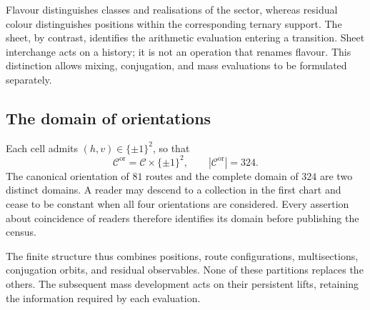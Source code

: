 Flavour distinguishes classes and realisations of the sector, whereas residual
colour distinguishes positions within the corresponding ternary support.
The sheet, by contrast, identifies the arithmetic evaluation entering
a transition. Sheet interchange acts on a history; it is not
an operation that renames flavour. This distinction allows
mixing, conjugation, and mass evaluations to be formulated
separately.

\subsection{The domain of orientations}

Each cell admits \((h,v)\in\{\pm1\}^2\), so that
\[
 \mathcal C^{\mathrm{or}}=\mathcal C\times\{\pm1\}^2,
 \qquad |\mathcal C^{\mathrm{or}}|=324.
\]
The canonical orientation of \(81\) routes and the complete domain of \(324\)
are two distinct domains. A reader may descend to a collection in the
first chart and cease to be constant when all four
orientations are considered. Every assertion about coincidence of readers
therefore identifies its domain before publishing the census.

The finite structure thus combines positions, route configurations,
multisections, conjugation orbits, and residual observables. None
of these partitions replaces the others. The subsequent mass development
acts on their persistent lifts, retaining the information
required by each evaluation.
